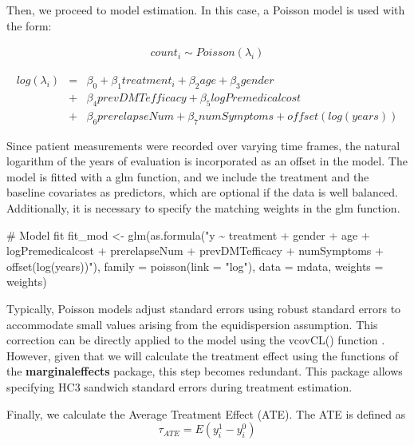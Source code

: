 \documentclass[
  letterpaper,
  DIV=11,
  numbers=noendperiod]{scrreprt}
\newenvironment{Shaded}{\begin{snugshade}}{\end{snugshade}}
\newcommand{\AttributeTok}[1]{\textcolor[rgb]{0.40,0.45,0.13}{#1}}
\newcommand{\CommentTok}[1]{\textcolor[rgb]{0.37,0.37,0.37}{#1}}
\newcommand{\FunctionTok}[1]{\textcolor[rgb]{0.28,0.35,0.67}{#1}}
\newcommand{\NormalTok}[1]{\textcolor[rgb]{0.00,0.23,0.31}{#1}}
\newcommand{\OtherTok}[1]{\textcolor[rgb]{0.00,0.23,0.31}{#1}}
\newcommand{\StringTok}[1]{\textcolor[rgb]{0.13,0.47,0.30}{#1}}
\begin{document}
Then, we proceed to model estimation. In this case, a Poisson model is
used with the form:

\[\begin{eqnarray}count_i\sim Poisson(\lambda_i)\end{eqnarray}\]

\[\begin{eqnarray} log(\lambda_i) &=& \beta_0 + \beta_1treatment_i + \beta_2age + \beta_3gender \\ &+& \beta_4prevDMTefficacy + \beta_5logPremedicalcost
\\ &+& \beta_6prerelapseNum + \beta_7numSymptoms + offset(log(years))\end{eqnarray}\]

Since patient measurements were recorded over varying time frames, the
natural logarithm of the years of evaluation is incorporated as an
offset in the model. The model is fitted with a glm function, and we
include the treatment and the baseline covariates as predictors, which
are optional if the data is well balanced. Additionally, it is necessary
to specify the matching weights in the glm function.

\begin{Shaded}
\begin{Highlighting}[]
\CommentTok{\# Model fit}
\NormalTok{fit\_mod }\OtherTok{\textless{}{-}} \FunctionTok{glm}\NormalTok{(}\FunctionTok{as.formula}\NormalTok{(}\StringTok{"y \textasciitilde{} treatment + gender + age + logPremedicalcost + prerelapseNum + prevDMTefficacy + numSymptoms + offset(log(years))"}\NormalTok{),}
                 \AttributeTok{family =} \FunctionTok{poisson}\NormalTok{(}\AttributeTok{link =} \StringTok{"log"}\NormalTok{),}
                 \AttributeTok{data =}\NormalTok{ mdata,}
                 \AttributeTok{weights =}\NormalTok{ weights)}
\end{Highlighting}
\end{Shaded}

Typically, Poisson models adjust standard errors using robust standard
errors to accommodate small values arising from the equidispersion
assumption. This correction can be directly applied to the model using
the vcovCL() function \cite{zeileis_sandwich_2022}. However, given that
we will calculate the treatment effect using the functions of the
\textbf{marginaleffects} package, this step becomes redundant. This
package allows specifying HC3 sandwich standard errors during treatment
estimation.

Finally, we calculate the Average Treatment Effect (ATE). The ATE is
defined as \[\tau_{ATE}=E(y_i^1-y_i^0)\]
\end{document}
